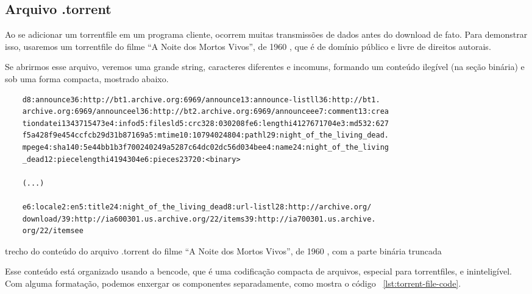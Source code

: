 
\newpage
\subsection*{Arquivo .torrent}
\label{sec:bencode}

Ao se adicionar um \gls*{torrentfile} em um programa cliente, ocorrem muitas
transmissões de dados antes do download de fato. Para demonstrar isso, usaremos um
\gls*{torrentfile} do filme \enquote{A Noite dos Mortos Vivos}, de 1960
\cite{torrent-file}, que é de domínio público e livre de direitos autorais.

Se abrirmos esse arquivo, veremos uma grande \gls{string}, caracteres diferentes e
incomuns, formando um conteúdo ilegível (na seção binária) e sob uma forma compacta,
mostrado abaixo.

\begin{listing}[H]
    \begin{verbatim}
    d8:announce36:http://bt1.archive.org:6969/announce13:announce-listll36:http://bt1.
    archive.org:6969/announceel36:http://bt2.archive.org:6969/announceee7:comment13:crea
    tiondatei1343715473e4:infod5:filesld5:crc328:030208fe6:lengthi4127671704e3:md532:627
    f5a428f9e454ccfcb29d31b87169a5:mtime10:10794024804:pathl29:night_of_the_living_dead.
    mpege4:sha140:5e44bb1b3f700240249a5287c64dc02dc56d034bee4:name24:night_of_the_living
    _dead12:piecelengthi4194304e6:pieces23720:<binary>

    (...)

    e6:locale2:en5:title24:night_of_the_living_dead8:url-listl28:http://archive.org/
    download/39:http://ia600301.us.archive.org/22/items39:http://ia700301.us.archive.
    org/22/itemsee
    \end{verbatim}

    \caption{trecho do conteúdo do arquivo .torrent do filme \enquote{A Noite dos Mortos
    Vivos}, de 1960 \cite{torrent-file}, com a parte binária truncada}
    \label{lst:torrent-file-raw}
\end{listing}

Esse conteúdo está organizado usando a \gls{bencode}, que é uma codificação compacta de
arquivos, especial para \glspl*{torrentfile}, e ininteligível. Com alguma formatação,
podemos enxergar os componentes separadamente, como mostra o código
~\ref{lst:torrent-file-code}.

